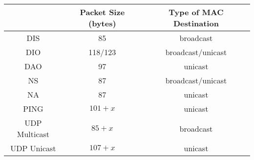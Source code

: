 {
	\begin{tabular}{|c|c|c|}
		\hline
		       & Packet Size (bytes) & Type of MAC Destination \\ \hline
		DIS    & 85                  & broadcast                       \\ \hline
		DIO  & 118/123                 & broadcast/unicast                       \\ \hline
		DAO    & 97                  & unicast                      \\ \hline
		NS & 87                  & broadcast/unicast                       \\ \hline
		NA     & 87                  & unicast                      \\ \hline
		PING   & $101+x$               & unicast                      \\ \hline
		UDP Multicast   & $85+x$                  & broadcast               \\ \hline
		UDP Unicast   & $107+x$                  & unicast                       \\ \hline
	\end{tabular}
}
